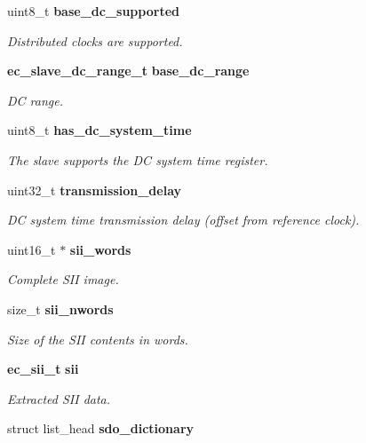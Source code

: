 \begin{DoxyCompactItemize}
uint8\-\_\-t {\bf base\-\_\-dc\-\_\-supported}
\begin{DoxyCompactList}\small\item\em Distributed clocks are supported. \end{DoxyCompactList}\item 
{\bf ec\-\_\-slave\-\_\-dc\-\_\-range\-\_\-t} {\bf base\-\_\-dc\-\_\-range}
\begin{DoxyCompactList}\small\item\em D\-C range. \end{DoxyCompactList}\item 
uint8\-\_\-t {\bf has\-\_\-dc\-\_\-system\-\_\-time}
\begin{DoxyCompactList}\small\item\em The slave supports the D\-C system time register. \end{DoxyCompactList}\item 
uint32\-\_\-t {\bf transmission\-\_\-delay}
\begin{DoxyCompactList}\small\item\em D\-C system time transmission delay (offset from reference clock). \end{DoxyCompactList}\item 
uint16\-\_\-t $\ast$ {\bf sii\-\_\-words}
\begin{DoxyCompactList}\small\item\em Complete S\-I\-I image. \end{DoxyCompactList}\item 
size\-\_\-t {\bf sii\-\_\-nwords}
\begin{DoxyCompactList}\small\item\em Size of the S\-I\-I contents in words. \end{DoxyCompactList}\item 
{\bf ec\-\_\-sii\-\_\-t} {\bf sii}
\begin{DoxyCompactList}\small\item\em Extracted S\-I\-I data. \end{DoxyCompactList}\item 
struct list\-\_\-head {\bf sdo\-\_\-dictionary}\label{structec__slave_a2754265971634ba5f97ce28fc1029d58}


\end{DoxyCompactItemize}
